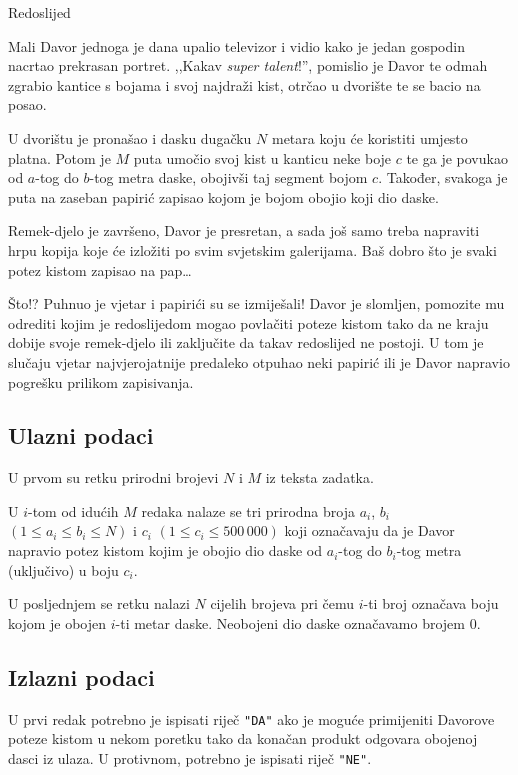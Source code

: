 \begin{statement}[
  problempoints=100,
  timelimit=4 sekunde,
  memorylimit=512 MiB,
]{Redoslijed}

Mali Davor jednoga je dana upalio televizor i vidio kako je jedan gospodin
nacrtao prekrasan portret. ,,Kakav \textit{super talent}!'', pomislio je
Davor te odmah zgrabio kantice s bojama i svoj najdraži kist, otrčao u
dvorište te se bacio na posao.

U dvorištu je pronašao i dasku dugačku $N$ metara koju će koristiti umjesto
platna. Potom je $M$ puta umočio svoj kist u kanticu neke boje $c$ te ga je
povukao od $a$-tog do $b$-tog metra daske, obojivši taj segment bojom $c$.
Također, svakoga je puta na zaseban papirić zapisao kojom je bojom obojio
koji dio daske.

Remek-djelo je završeno, Davor je presretan, a sada još samo treba napraviti
hrpu kopija koje će izložiti po svim svjetskim galerijama. Baš dobro što je
svaki potez kistom zapisao na pap\dots

Što!? Puhnuo je vjetar i papirići su se izmiješali! Davor je slomljen, pomozite
mu odrediti kojim je redoslijedom mogao povlačiti poteze kistom tako da ne
kraju dobije svoje remek-djelo ili zaključite da takav redoslijed ne postoji.
U tom je slučaju vjetar najvjerojatnije predaleko otpuhao neki papirić ili je
Davor napravio pogrešku prilikom zapisivanja.

\subsection*{Ulazni podaci}
U prvom su retku prirodni brojevi $N$ i $M$ iz teksta zadatka.

U $i$-tom od idućih $M$ redaka nalaze se tri prirodna broja $a_i$, $b_i$ $(1
\le a_i \le b_i \le N)$ i $c_i$ $(1 \le c_i \le 500\,000)$ koji označavaju da
je Davor napravio potez kistom kojim je obojio dio daske od $a_i$-tog do
$b_i$-tog metra (uključivo) u boju $c_i$.

U posljednjem se retku nalazi $N$ cijelih brojeva pri čemu $i$-ti broj označava
boju kojom je obojen $i$-ti metar daske. Neobojeni dio daske označavamo brojem
$0$.

\subsection*{Izlazni podaci}
U prvi redak potrebno je ispisati riječ \texttt{"DA"} ako je moguće primijeniti
Davorove poteze kistom u nekom poretku tako da konačan produkt odgovara obojenoj
dasci iz ulaza. U protivnom, potrebno je ispisati riječ \texttt{"NE"}.


\end{statement}
